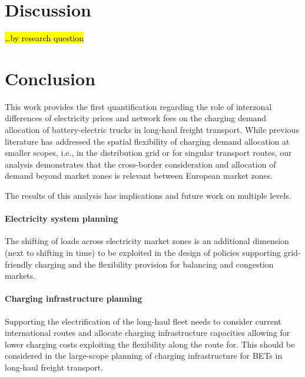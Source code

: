 \documentclass[preprint,10pt,review, authoryear]{elsarticle}
\begin{document}
\section{Discussion}
    \hl{\dots by research question}
\section{Conclusion}
    This work provides the first quantification regarding the role of interzonal differences of electricity prices and network fees on the charging demand allocation of battery-electric trucks in long-haul freight transport. While previous literature has addressed the spatial flexibility of charging demand allocation at smaller scopes, i.e., in the distribution grid or for singular transport routes, our analysis demonstrates that the cross-border consideration and allocation of demand beyond market zones is relevant between European market zones. 

    The results of this analysis has implications and future work on multiple levels.

    \paragraph{Electricity system planning}
    The shifting of loads across electricity market zones is an additional dimension (next to shifting in time) to be exploited in the design of policies supporting grid-friendly charging and the flexibility provision for balancing and congestion markets.
    
    \paragraph{Charging infrastructure planning}
        Supporting the electrification of the long-haul fleet needs to consider current international routes and allocate charging infrastructure capacities allowing for lower charging costs exploiting the flexibility along the route for. This should be considered in the large-scope planning of charging infrastructure for BETs in long-haul freight transport.
\end{document}
